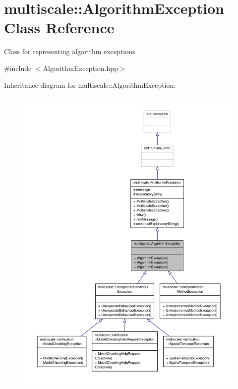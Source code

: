 \hypertarget{classmultiscale_1_1AlgorithmException}{\section{multiscale\-:\-:Algorithm\-Exception Class Reference}
\label{classmultiscale_1_1AlgorithmException}
}


Class for representing algorithm exceptions.  




{\ttfamily \#include $<$Algorithm\-Exception.\-hpp$>$}



Inheritance diagram for multiscale\-:\-:Algorithm\-Exception\-:\nopagebreak
\begin{figure}[H]
\begin{center}
\leavevmode
\includegraphics[width=350pt]{classmultiscale_1_1AlgorithmException__inherit__graph}
\end{center}
\end{figure}



